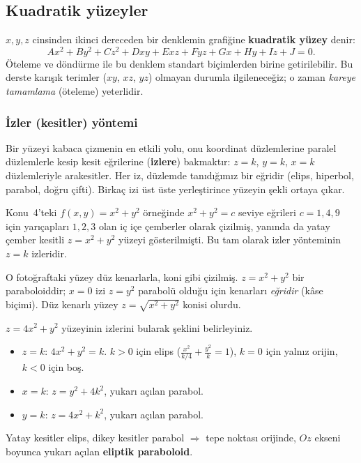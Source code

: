 \subsection{Kuadratik yüzeyler}

\begin{tanim}
$x,y,z$ cinsinden ikinci dereceden bir denklemin grafiğine \textbf{kuadratik yüzey} denir:
\[ Ax^2+By^2+Cz^2+Dxy+Exz+Fyz+Gx+Hy+Iz+J=0 . \]
Öteleme ve döndürme ile bu denklem standart biçimlerden birine getirilebilir. Bu derste karışık terimler ($xy$, $xz$, $yz$) olmayan durumla ilgileneceğiz; o zaman \emph{kareye tamamlama} (öteleme) yeterlidir.
\end{tanim}

\subsubsection{İzler (kesitler) yöntemi}

Bir yüzeyi kabaca çizmenin en etkili yolu, onu koordinat düzlemlerine paralel düzlemlerle kesip kesit eğrilerine (\textbf{izlere}) bakmaktır: $z=k$, $y=k$, $x=k$ düzlemleriyle arakesitler. Her iz, düzlemde tanıdığımız bir eğridir (elips, hiperbol, parabol, doğru çifti). Birkaç izi üst üste yerleştirince yüzeyin şekli ortaya çıkar.

\begin{tahta}
Konu~4'teki $f(x,y)=x^2+y^2$ örneğinde $x^2+y^2=c$ seviye eğrileri $c=1,4,9$ için yarıçapları $1,2,3$ olan iç içe çemberler olarak çizilmiş, yanında da yatay çember kesitli $z=x^2+y^2$ yüzeyi gösterilmişti. Bu tam olarak izler yönteminin $z=k$ izleridir.
\end{tahta}
\begin{bilgi}
O fotoğraftaki yüzey düz kenarlarla, koni gibi çizilmiş. $z=x^2+y^2$ bir paraboloiddir; $x=0$ izi $z=y^2$ parabolü olduğu için kenarları \emph{eğridir} (kâse biçimi). Düz kenarlı yüzey $z=\sqrt{x^2+y^2}$ konisi olurdu.
\end{bilgi}

\begin{soru}
$z=4x^2+y^2$ yüzeyinin izlerini bularak şeklini belirleyiniz.
\end{soru}
\begin{cevap}
\begin{itemize}
  \item $z=k$: $4x^2+y^2=k$. $k>0$ için elips ($\frac{x^2}{k/4}+\frac{y^2}{k}=1$), $k=0$ için yalnız orijin, $k<0$ için boş.
  \item $x=k$: $z=y^2+4k^2$, yukarı açılan parabol.
  \item $y=k$: $z=4x^2+k^2$, yukarı açılan parabol.
\end{itemize}
Yatay kesitler elips, dikey kesitler parabol $\Rightarrow$ tepe noktası orijinde, $Oz$ ekseni boyunca yukarı açılan \textbf{eliptik paraboloid}.
\end{cevap}

